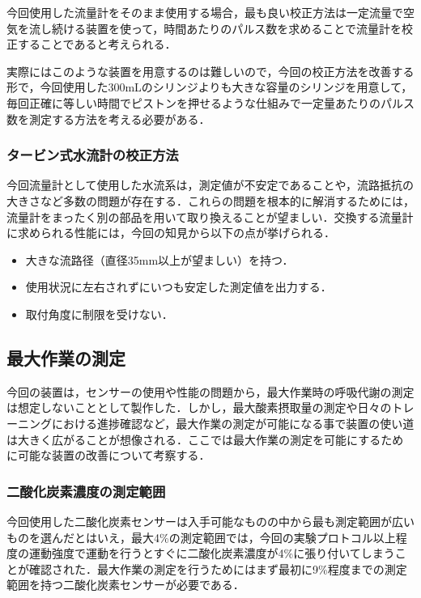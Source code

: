 今回使用した流量計をそのまま使用する場合，最も良い校正方法は一定流量で空気を流し続ける装置を使って，時間あたりのパルス数を求めることで流量計を校正することであると考えられる．

実際にはこのような装置を用意するのは難しいので，今回の校正方法を改善する形で，今回使用した300mLのシリンジよりも大きな容量のシリンジを用意して，毎回正確に等しい時間でピストンを押せるような仕組みで一定量あたりのパルス数を測定する方法を考える必要がある．

\subsubsection{タービン式水流計の校正方法}

今回流量計として使用した水流系は，測定値が不安定であることや，流路抵抗の大きさなど多数の問題が存在する．これらの問題を根本的に解消するためには，流量計をまったく別の部品を用いて取り換えることが望ましい．交換する流量計に求められる性能には，今回の知見から以下の点が挙げられる．

\begin{itemize}
  \item 大きな流路径（直径35mm以上が望ましい）を持つ．
  \item 使用状況に左右されずにいつも安定した測定値を出力する．
  \item 取付角度に制限を受けない．
\end{itemize}

\subsection{最大作業の測定}

今回の装置は，センサーの使用や性能の問題から，最大作業時の呼吸代謝の測定は想定しないこととして製作した．しかし，最大酸素摂取量の測定や日々のトレーニングにおける進捗確認など，最大作業の測定が可能になる事で装置の使い道は大きく広がることが想像される．ここでは最大作業の測定を可能にするために可能な装置の改善について考察する．

\subsubsection{二酸化炭素濃度の測定範囲}

今回使用した二酸化炭素センサーは入手可能なものの中から最も測定範囲が広いものを選んだとはいえ，最大4\%の測定範囲では，今回の実験プロトコル以上程度の運動強度で運動を行うとすぐに二酸化炭素濃度が4\%に張り付いてしまうことが確認された．最大作業の測定を行うためにはまず最初に9\%程度までの測定範囲を持つ二酸化炭素センサーが必要である．


